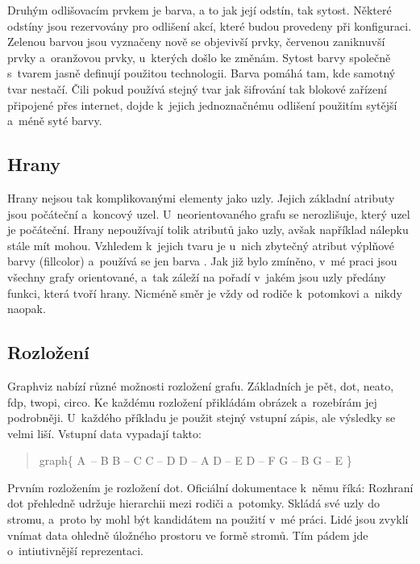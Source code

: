 \documentclass[color,table,oneside,nolot,nolof]{fithesis}
\begin{document}
	Druhým odlišovacím prvkem je barva, a to jak její odstín, tak sytost. Některé odstíny jsou rezervovány pro odlišení akcí, které budou provedeny při konfiguraci. Zelenou barvou jsou vyznačeny
	nově se objevivší prvky, červenou zaniknuvší prvky a~oranžovou prvky, u~kterých došlo ke změnám. Sytost barvy společně s~tvarem jasně definují použitou technologii. Barva pomáhá tam, kde
	samotný tvar nestačí. Čili pokud používá stejný tvar jak šifrování tak blokové zařízení připojené přes internet, dojde k~jejich jednoznačnému odlišení použitím sytější a~méně syté barvy.

\subsection{Hrany}
	Hrany nejsou tak komplikovanými elementy jako uzly. Jejich základní atributy jsou počáteční a~koncový uzel. U~neorientovaného grafu se nerozlišuje, který uzel je počáteční. Hrany 
	nepoužívají tolik atributů jako uzly, avšak například nálepku stále mít mohou. Vzhledem k~jejich tvaru je u~nich zbytečný atribut výplňové barvy (fillcolor) a~používá se jen barva 
	.
	Jak již bylo zmíněno, v~mé praci jsou všechny grafy orientované, a~tak záleží na pořadí v~jakém jsou uzly předány funkci, která tvoří hrany. Nicméně směr je vždy od rodiče k~potomkovi
	a~nikdy naopak.
	
\subsection{Rozložení}
	Graphviz nabízí různé možnosti rozložení grafu. Základních je pět, dot, neato, fdp, twopi, circo. Ke každému rozložení přikládám obrázek a~rozebírám jej 
	podrobněji. U~každého příkladu je použit stejný vstupní zápis, ale výsledky se velmi liší. Vstupní data vypadají takto:
	\begin{quotation}
	graph\{
		A~-- B
		B -- C
		C -- D
		D -- A
		D -- E
		D -- F
		G -- B
		G -- E
	\}
	\end{quotation}

	Prvním rozložením je rozložení dot. Oficiální dokumentace k~němu říká:
	\cite{graphviz_layout} 
	Rozhraní dot přehledně udržuje hierarchii mezi rodiči a~potomky. Skládá
	své uzly do stromu, a~proto by mohl být kandidátem na použití v~mé práci. Lidé jsou zvyklí vnímat data ohledně úložného prostoru ve formě stromů. Tím pádem jde o~intiutivnější
	reprezentaci.
\end{document}
